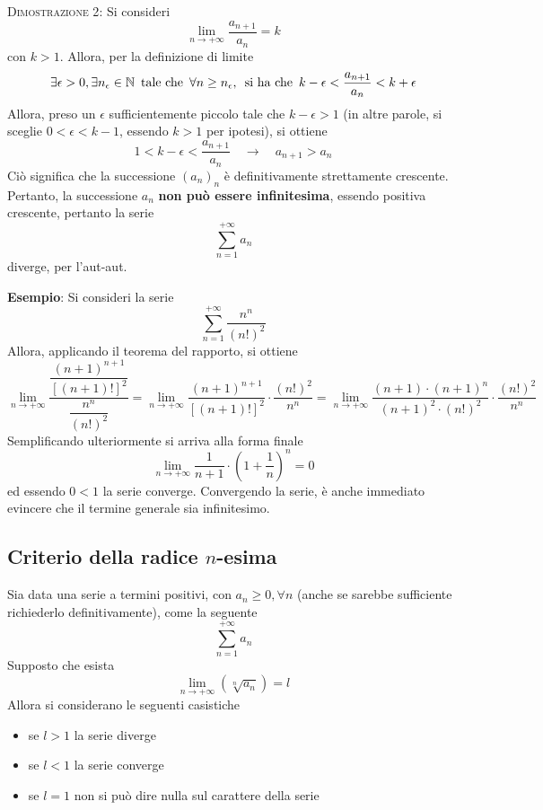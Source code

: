 \documentclass[a4paper]{extarticle}
\begin{document}
\newpage
\noindent
\normalfont \normalsize
\textsc{Dimostrazione 2}: Si consideri 
\[\lim_{n \to +\infty} \frac{a_{n+1}}{a_n}=k\]
con $k>1$. Allora, per la definizione di limite
\[\exists \epsilon > 0, \exists n_\epsilon \in \mathbb{N} \hspace{0.5em} \text{tale che} \hspace{0.5em} \forall n \geq n_\epsilon, \hspace{0.5em} \text{si ha che} \hspace{0.5em} k - \epsilon < \frac{a_{n+1}}{a_n} < k+\epsilon\]
Allora, preso un $\epsilon$ sufficientemente piccolo tale che $k-\epsilon>1$ (in altre parole, si sceglie $0 < \epsilon < k-1$, essendo $k>1$ per ipotesi), si ottiene
\[1 < k-\epsilon < \frac{a_{n+1}}{a_n} \hspace{1em} \rightarrow \hspace{1em} a_{n+1} > a_n\]
Ciò significa che la successione $(a_n)_n$ è definitivamente strettamente crescente. Pertanto, la successione $a_n$ \textbf{non può essere infinitesima}, essendo positiva crescente, pertanto la serie
\[\sum_{n=1}^{+\infty} a_n\]
diverge, per l'aut-aut.

\vspace{2em}
\noindent
\textbf{Esempio}: Si consideri la serie
\[\sum_{n=1}^{+\infty} \frac{n^n}{(n!)^2}\]
Allora, applicando il teorema del rapporto, si ottiene 
\[\lim_{n \to +\infty} \dfrac{\dfrac{(n+1)^{n+1}}{\left[(n+1)!\right]^2}}{\dfrac{n^n}{(n!)^2}} = \lim_{n \to +\infty} \dfrac{(n+1)^{n+1}}{\left[(n+1)!\right]^2} \cdot \dfrac{(n!)^2}{n^n} = \lim_{n \to +\infty} \dfrac{(n+1) \cdot (n+1)^{n}}{(n+1)^2 \cdot (n!)^2} \cdot \dfrac{(n!)^2}{n^n}\]
Semplificando ulteriormente si arriva alla forma finale
\[\lim_{n \to +\infty} \frac{1}{n+1} \cdot \left(1+\frac{1}{n}\right)^n = 0\]
ed essendo $0 < 1$ la serie converge. Convergendo la serie, è anche immediato evincere che il termine generale sia infinitesimo.

\vspace{2em}
\noindent
\subsection{Criterio della radice $n$-esima}
Sia data una serie a termini positivi, con $a_n \geq 0, \forall n$ (anche se sarebbe sufficiente richiederlo definitivamente), come la seguente
\[\sum_{n=1}^{+\infty} a_n\]
Supposto che esista
\[\lim_{n \to +\infty} \left(\sqrt[n]{a_n}\right)=l\]
Allora si considerano le seguenti casistiche
\begin{itemize}
    \item se $l>1$ la serie diverge
    \item se $l<1$ la serie converge
    \item se $l=1$ non si può dire nulla sul carattere della serie
\end{itemize}
\end{document}
